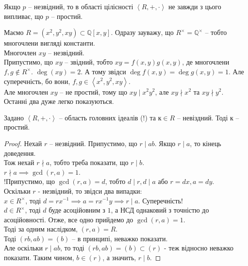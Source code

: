 \documentclass{math_library}
\begin{document}
\begin{remark}
Якщо $p$ -- незвідний, то в області цілісності $\left<R,+,\cdot \right>$ не завжди з цього випливає, що $p$ -- простий.
\end{remark}

\begin{example}
Маємо $R = \left(x^2,y^2,xy \right) \subset \mathbb{Q}[x,y]$. Одразу зауважу, що $R^\times = \mathbb{Q}^\times$ -- тобто многочлени вигляді константи.\\
Многочлен $xy$ -- незвідний.\\
Припустимо, що $xy$ -- звідний, тобто $xy = f(x,y)g(x,y)$, де многочлени $f,g \not\in R^\times$. $\deg (xy) = 2$. А тому звідси $\deg f(x,y) = \deg g(x,y) = 1$. Але суперечність, бо вони, $f,g \in \left< x^2,y^2, xy\right>$.\\
Але многочлен $xy$ -- не простий, тому що $xy \mid x^2y^2$, але $xy \nmid x^2$ та $xy \nmid y^2$. Останні два дуже легко показуються.
\end{example}

\begin{proposition}
Задано $\left<R,+,\cdot \right>$ -- область головних ідеалів (!) та $к \in R$ -- невіздний. Тоді $к$ -- простий.
\end{proposition}

\begin{proof}
Нехай $r$ -- незвідний. Припустимо, що $r \mid ab$. Якщо $r \mid a$, то кінець доведення.\\ Тож нехай $r \nmid a$, тобто треба показати, що $r \mid b$.\\
$r \nmid a \implies \gcd (r,a) = 1$.\\
!Припустимо, що $\gcd(r,a) = d$, тобто $d \mid r, d \mid a$ або $r = dx, a = dy$.\\
Оскільки $r$ - незвідний, то звідси два випадки:\\
$x \in R^\times$, тоді $d = rx^{-1} \implies a = rx^{-1}y \implies r \mid a$. Суперечність!\\
$d \in R^\times$, тоді $d$ буде асоційовним з $1$, а НСД однаковий з точністю до асоційовності. Отже, все одно прийдемо до $\gcd(r,a) = 1$.\\
Тоді за одним наслідком, $(r,a) = R$.\\
Тоді $(rb,ab) = (b)$ -- в принципі, неважко показати.\\
Але оскільки $r \mid ab$, то тоді $(rb,ab) = (b) \subset (r)$ - теж відносно неважко показати. Таким чином, $b \in (r)$, а значить, $r \mid b$.
\end{proof}
\end{document}
